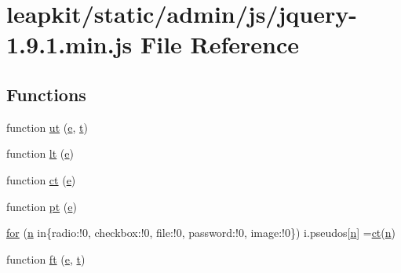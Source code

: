 \hypertarget{jquery-1_89_81_8min_8js}{\section{leapkit/static/admin/js/jquery-\/1.9.1.min.\-js File Reference}
\label{jquery-1_89_81_8min_8js}
}
\subsection*{Functions}
\begin{DoxyCompactItemize}
\item 
function \hyperlink{jquery-1_89_81_8min_8js_a2e5d5e2f7defab0a98da13d891d83e28}{ut} (\hyperlink{static_2root_2js_2jquery-ui_8custom_8min_8js_abea95a4e94bc6f4151d5683d4c12c3f4}{e}, \hyperlink{static_2root_2js_2bootstrap_2jquery-ui-1_810_84_8custom_8min_8js_acf335ef347969ef6dc8387e680fb289e}{t})
\item 
function \hyperlink{jquery-1_89_81_8min_8js_a206c6a1012b89ca3dfd8d06a96e05ac6}{lt} (\hyperlink{static_2root_2js_2jquery-ui_8custom_8min_8js_abea95a4e94bc6f4151d5683d4c12c3f4}{e})
\item 
function \hyperlink{jquery-1_89_81_8min_8js_a575f6c7d7524189c433202c3c357a568}{ct} (\hyperlink{static_2root_2js_2jquery-ui_8custom_8min_8js_abea95a4e94bc6f4151d5683d4c12c3f4}{e})
\item 
function \hyperlink{jquery-1_89_81_8min_8js_a391cb27f9c670379c16782d8b93a344c}{pt} (\hyperlink{static_2root_2js_2jquery-ui_8custom_8min_8js_abea95a4e94bc6f4151d5683d4c12c3f4}{e})
\item 
\hyperlink{jquery-1_89_81_8min_8js_a65e6907d617fb5de90c346b1bfd2fc5a}{for} (\hyperlink{static_2root_2js_2intro_8min_8js_afc984c4f6c68ce30a0af99006f5f8d27}{n} in\{radio\-:!0, checkbox\-:!0, file\-:!0, password\-:!0, image\-:!0\}) i.\-pseudos\mbox{[}\hyperlink{static_2root_2js_2intro_8min_8js_afc984c4f6c68ce30a0af99006f5f8d27}{n}\mbox{]} =\hyperlink{jquery_8min_8js_a575f6c7d7524189c433202c3c357a568}{ct}(\hyperlink{static_2root_2js_2intro_8min_8js_afc984c4f6c68ce30a0af99006f5f8d27}{n})
\item 
function \hyperlink{jquery-1_89_81_8min_8js_af54dd2193e747e35719bd35992a033e8}{ft} (\hyperlink{static_2root_2js_2jquery-ui_8custom_8min_8js_abea95a4e94bc6f4151d5683d4c12c3f4}{e}, \hyperlink{static_2root_2js_2bootstrap_2jquery-ui-1_810_84_8custom_8min_8js_acf335ef347969ef6dc8387e680fb289e}{t})
\item 

\end{DoxyCompactItemize}
